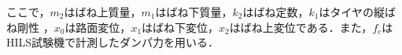 \documentclass{article_vdlab_sotsuron_youshi}
\begin{document}


\vspace{-1mm}
\noindent
ここで，$m_2$はばね上質量，$m_1$はばね下質量，$k_2$はばね定数，$k_1$はタイヤの縦ばね剛性
，$x_0$は路面変位，$x_1$はばね下変位，$x_2$はばね上変位である．また，$f_c$はHILS試験機で計測したダンパ力を用いる．
\end{document}
